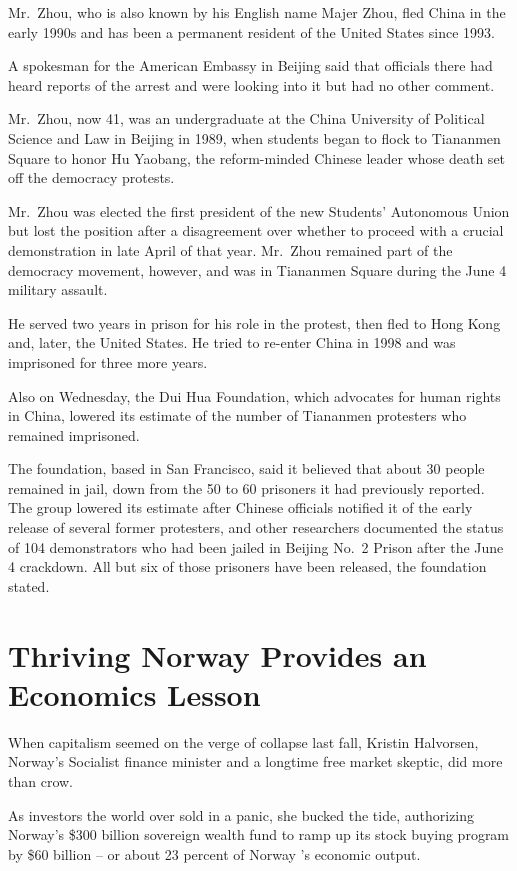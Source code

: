 \documentclass[12pt,a4paper,onecolumn]{article}
\begin{document}
Mr.~Zhou, who is also known by his English name Majer Zhou, fled China in the early 1990s and has
been a permanent resident of the United States since 1993.

A spokesman for the American Embassy in Beijing said that officials there had heard reports of the
arrest and were looking into it but had no other comment.

Mr.~Zhou, now 41, was an undergraduate at the China University of Political Science and Law in
Beijing in 1989, when students began to flock to Tiananmen Square to honor Hu Yaobang, the
reform-minded Chinese leader whose death set off the democracy protests.

Mr.~Zhou was elected the first president of the new Students' Autonomous Union but lost the position
after a disagreement over whether to proceed with a crucial demonstration in late April of that
year. Mr.~Zhou remained part of the democracy movement, however, and was in Tiananmen Square during
the June 4 military assault.

He served two years in prison for his role in the protest, then fled to Hong Kong and, later, the
United States. He tried to re-enter China in 1998 and was imprisoned for three more years.

Also on Wednesday, the Dui Hua Foundation, which advocates for human rights in China, lowered its
estimate of the number of Tiananmen protesters who remained imprisoned.

The foundation, based in San Francisco, said it believed that about 30 people remained in jail, down
from the 50 to 60 prisoners it had previously reported. The group lowered its estimate after Chinese
officials notified it of the early release of several former protesters, and other researchers
documented the status of 104 demonstrators who had been jailed in Beijing No.~2 Prison after the June 4 crackdown. All but six of those prisoners have been released, the foundation stated.

\section{Thriving Norway Provides an Economics Lesson}

When capitalism seemed on the verge of collapse last fall, Kristin Halvorsen, Norway's Socialist
finance minister and a longtime free market skeptic, did more than crow.

As investors the world over sold in a panic, she bucked the tide, authorizing Norway's \$300 billion
sovereign wealth fund to ramp up its stock buying program by \$60 billion -- or about 23 percent of
Norway 's economic output.
\end{document}
